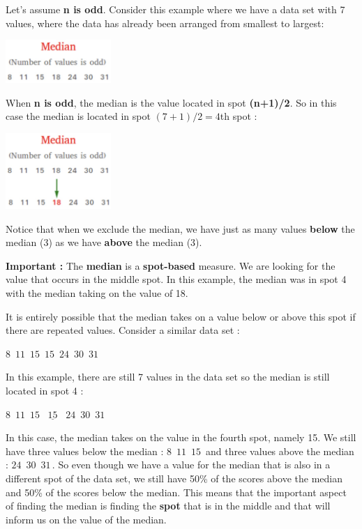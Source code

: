 \documentclass[
  letterpaper,
  DIV=11,
  numbers=noendperiod]{scrreprt}
\begin{document}
Let's assume \textbf{n is odd}. Consider this example where we have a
data set with 7 values, where the data has already been arranged from
smallest to largest:

\includegraphics[width=0.3\textwidth,height=\textheight]{./images/Daily-4-Pic-4.jpg}

When \textbf{n is odd}, the median is the value located in spot
\textbf{(n+1)/2}. So in this case the median is located in spot
\((7+1)/2 = 4\)th spot :

\includegraphics[width=0.3\textwidth,height=\textheight]{./images/Daily-4-Pic-5.jpg}

Notice that when we exclude the median, we have just as many values
\textbf{below} the median (3) as we have \textbf{above} the median (3).

\textbf{Important :} The \textbf{median} is a \textbf{spot-based}
measure. We are looking for the value that occurs in the middle spot. In
this example, the median was in spot 4 with the median taking on the
value of 18.

It is entirely possible that the median takes on a value below or above
this spot if there are repeated values. Consider a similar data set :

\(8\,\,\, 11\,\,\,  15\,\,\,  15\,\,\,  24\,\,\,  30\,\,\,  31\)

In this example, there are still 7 values in the data set so the median
is still located in spot 4 :

\(8\,\,\, 11\,\,\,  15\,\,\,  \underline{\,\,15\,\,}\,\,\,  24\,\,\,  30\,\,\,  31\)

In this case, the median takes on the value in the fourth spot, namely
15. We still have three values below the median :
\(8\,\,\, 11 \,\,\, 15\,\) and three values above the median :
\(24 \,\,\, 30\,\,\, 31\,\). So even though we have a value for the
median that is also in a different spot of the data set, we still have
50\% of the scores above the median and 50\% of the scores below the
median. This means that the important aspect of finding the median is
finding the \textbf{spot} that is in the middle and that will inform us
on the value of the median.
\end{document}
